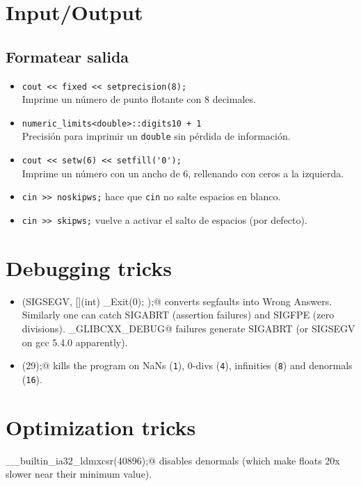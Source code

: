 \section{Input/Output}
    \subsection{Formatear salida}
    \begin{itemize}
        \item \verb|cout << fixed << setprecision(8);| \\
        Imprime un número de punto flotante con 8 decimales.
        \item \verb|numeric_limits<double>::digits10 + 1| \\
        Precisión para imprimir un \texttt{double} sin pérdida de información.
        \item \verb|cout << setw(6) << setfill('0');| \\
        Imprime un número con un ancho de 6, rellenando con ceros a la izquierda.
        \item \verb|cin >> noskipws;| hace que \texttt{cin} no salte espacios en blanco.
        \item \verb|cin >> skipws;| vuelve a activar el salto de espacios (por defecto).
    \end{itemize}

\section{Debugging tricks}
    \begin{itemize}
        \item \verb@signal(SIGSEGV, [](int) { _Exit(0); });@ converts segfaults into Wrong Answers.
            Similarly one can catch SIGABRT (assertion failures) and SIGFPE (zero divisions).
            \verb@_GLIBCXX_DEBUG@ failures generate SIGABRT (or SIGSEGV on gcc 5.4.0 apparently).
        \item \verb@feenableexcept(29);@ kills the program on NaNs (\texttt 1), 0-divs (\texttt 4), infinities (\texttt 8) and denormals (\texttt{16}).
    \end{itemize}

\section{Optimization tricks}
    \verb@__builtin_ia32_ldmxcsr(40896);@ disables denormals (which make floats 20x slower near their minimum value).
